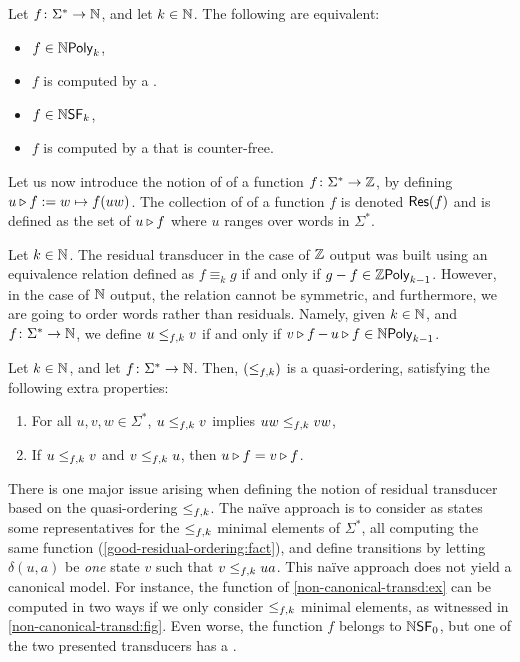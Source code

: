 \begin{theorem}
    Let $f \colon \Sigma^* \to \Nat$, and let $k \in \Nat$.
    The following are equivalent:
    \begin{itemize}
        \item $f \in \NPoly[k]$,
        \item $f$ is computed by a .
    \end{itemize}
    \begin{itemize}
        \item $f \in \NSF[k]$,
        \item $f$ is computed by a 
            that is counter-free.
    \end{itemize}
\end{theorem}

\AP Let us now introduce the notion of  of a function $f
\colon \Sigma^* \to \Rel$, by defining $\app{f}{u} \defined w \mapsto f(uw)$.
The collection of  of a function $f$ is denoted $\Res(f)$
and is defined as the set of $\app{f}{u}$ where $u$ ranges over words in
$\Sigma^*$.

\AP Let $k \in \Nat$. The residual transducer in the case of $\Rel$ output was
built using an equivalence relation defined as $f \equiv_k g$ if and only if $g
- f \in \ZPoly[k-1]$. However, in the case of $\Nat$ output, the relation
cannot be symmetric, and furthermore, we are going to order words rather than
residuals. Namely, given $k \in \Nat$, and $f \colon \Sigma^* \to \Nat$, we
define $u \resleq{f}{k} v$ if and only if $\app{f}{v} - \app{f}{u} \in
\NPoly[k-1]$.

\begin{fact}
    \label{good-residual-ordering:fact}
    Let $k \in \Nat$, and let $f \colon \Sigma^* \to \Nat$. Then,
    $(\resleq{f}{k})$ is a quasi-ordering, satisfying the following
    extra properties:
    \begin{enumerate}
        \item For all $u,v,w \in \Sigma^*$, $u \resleq{f}{k} v$
            implies $uw \resleq{f}{k} vw$,
        \item If $u \resleq{f}{k} v$ and $v \resleq{f}{k} u$,
            then $\app{f}{u} = \app{f}{v}$.
    \end{enumerate}
\end{fact}

There is one major issue arising when defining the notion of residual
transducer based on the quasi-ordering $\resleq{f}{k}$. The naïve approach is
to consider as states some representatives for the $\resleq{f}{k}$ minimal
elements of $\Sigma^*$, all computing the same function
(\cref{good-residual-ordering:fact}), and define transitions by letting
$\delta(u, a)$ be \emph{one} state $v$ such that $v \resleq{f}{k} ua$. This
naïve approach does not yield a canonical model.
For instance, the function
of \cref{non-canonical-transd:ex} can be computed in two ways if we only
consider $\resleq{f}{k}$ minimal elements, as witnessed in
\cref{non-canonical-transd:fig}. Even worse, the function $f$ belongs to
$\NSF[0]$, but one of the two presented transducers has a .

